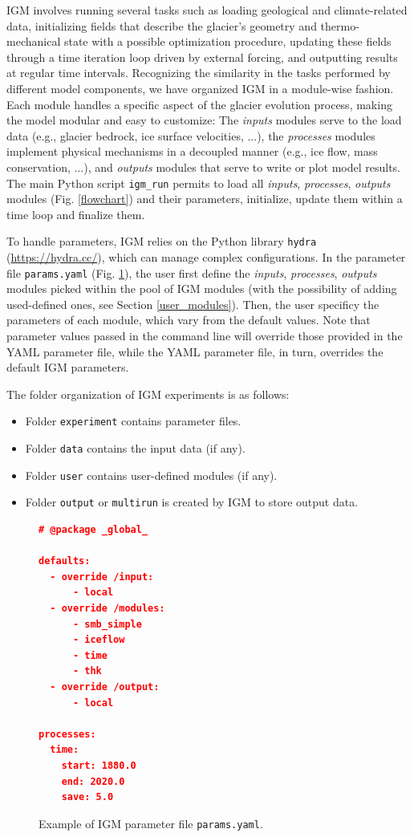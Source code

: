 \documentclass[gmd]{copernicus}
\begin{document}
IGM involves running several tasks such as loading geological and climate-related data, initializing fields that describe the glacier's geometry and thermo-mechanical state with a possible optimization procedure, updating these fields through a time iteration loop driven by external forcing, and outputting results at regular time intervals. Recognizing the similarity in the tasks performed by different model components, we have organized IGM in a module-wise fashion. Each module handles a specific aspect of the glacier evolution process, making the model modular and easy to customize: The \textit{inputs} modules serve to the load data (e.g., glacier bedrock, ice surface velocities, ...), the \textit{processes} modules implement physical mechanisms in a decoupled manner (e.g., ice flow, mass conservation, ...), and \textit{outputs} modules that serve to write or plot model results. The main Python script \texttt{igm\_run} permits to load all \textit{inputs}, \textit{processes}, \textit{outputs} modules (Fig. \ref{flowchart}) and their parameters, initialize, update them within a time loop and finalize them. 

To handle parameters, IGM relies on the Python library \texttt{hydra} (\url{https://hydra.cc/}), which can manage complex configurations. In the parameter file \texttt{params.yaml} (Fig. \ref{ex_yaml}), the user first define the \textit{inputs}, \textit{processes}, \textit{outputs} modules picked within the pool of IGM modules (with the possibility of adding used-defined ones, see Section \ref{user_modules}). Then, the user specificy the parameters of each module, which vary from the default values. Note that parameter values passed in the command line will override those provided in the YAML parameter file, while the YAML parameter file, in turn, overrides the default IGM parameters. 

The folder organization of IGM experiments is as follows:
\begin{itemize}
  \item Folder \texttt{experiment} contains parameter files.
  \item Folder \texttt{data} contains the input data (if any).
  \item Folder \texttt{user} contains user-defined modules (if any).
  \item Folder \texttt{output} or \texttt{multirun} is created by IGM to store output data.
\end{itemize}
 
\begin{figure}[!h]  
\begin{lstlisting}[language=json,numbers=none,framexleftmargin=0pt]
# @package _global_
 
defaults:
  - override /input: 
      - local
  - override /modules: 
      - smb_simple
      - iceflow
      - time
      - thk
  - override /output: 
      - local

processes: 
  time:
    start: 1880.0
    end: 2020.0
    save: 5.0
\end{lstlisting}
\caption{Example of IGM parameter file \texttt{params.yaml}. \label{ex_yaml}}
\end{figure}
\end{document}
